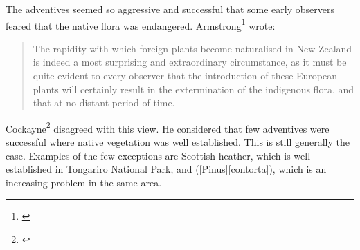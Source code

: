 The adventives seemed so aggressive and successful that some early observers feared that the native flora was endangered.
Armstrong\footnote{\cite{armstrong1872naturalised}} wrote:

\begin{quote}
	The rapidity with which foreign plants become naturalised in New Zealand is indeed a most surprising and extraordinary circumstance, as it must be quite evident to every observer that the introduction of these European plants will certainly result in the extermination of the indigenous flora, and that at no distant period of time.
\end{quote}

Cockayne\footnote{\cite{cockayne1967plants}} disagreed with this view.
He considered that few adventives were successful where native vegetation was well established.
This is still generally the case.
Examples of the few exceptions are Scottish heather, which is well established in Tongariro National Park, and  ([Pinus][contorta]), which is an increasing problem in the same area.
